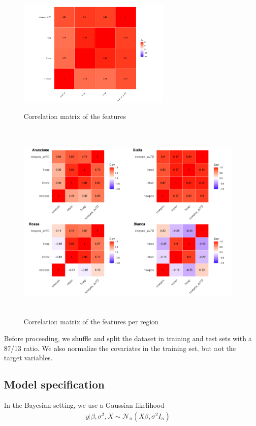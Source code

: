 \documentclass[12pt,a4paper]{article}
\theoremstyle{definition}
\theoremstyle{remark}
\begin{document}
\begin{figure}[htb!]
	\centering
	\includegraphics[width=75mm, height=60mm,scale=0.5]{corrmatrix.pdf}
	\caption{Correlation matrix of the features}
\end{figure}
\begin{figure}[htb!]
	\centering
	\includegraphics[width=130mm, height=100mm,scale=0.5]{corrmat2.pdf}
	\caption{Correlation matrix of the features per region}
\end{figure}
Before proceeding, we shuffle and split the dataset in training and test sets with a 87/13 ratio. We also normalize the covariates in the training set, but not the target variables.
\subsection{Model specification}
In the Bayesian setting, we use a Gaussian likelihood 
\begin{align*}
	y|\beta,\sigma^2,X \sim \mathcal{N}_n(X\beta,\sigma^2I_n)
\end{align*}
\end{document}
